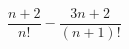 \begin{ex}[type=expression]
	\begin{condition}
		\( \dfrac{n+2}{n!}-\dfrac{3n+2}{(n+1)!} \)
	\end{condition}
\end{ex}